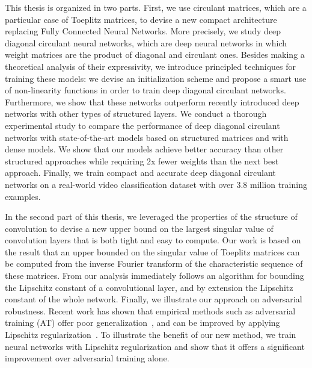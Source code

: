 This thesis is organized in two parts.
First, we use circulant matrices, which are a particular case of Toeplitz matrices, to devise a new compact architecture replacing Fully Connected Neural Networks.
More precisely, we study deep diagonal circulant neural networks, which are deep neural networks in which weight matrices are the product of diagonal and circulant ones.
Besides making a theoretical analysis of their expressivity, we introduce principled techniques for training these models: we devise an initialization scheme and propose a smart use of non-linearity functions in order to train deep diagonal circulant networks. 
Furthermore, we show that these networks outperform recently introduced deep networks with other types of structured layers.
We conduct a thorough experimental study to compare the performance of deep diagonal circulant networks with state-of-the-art models based on structured matrices and with dense models.
We show that our models achieve better accuracy than other structured approaches while requiring 2x fewer weights than the next best approach.
Finally, we train compact and accurate deep diagonal circulant networks on a real-world video classification dataset with over 3.8 million training examples. 

In the second part of this thesis, we leveraged the properties of the structure of convolution to devise a new upper bound on the largest singular value of convolution layers that is both tight and easy to compute. 
Our work is based on the result \cite{gray2006toeplitz} that an upper bounded on the singular value of Toeplitz matrices can be computed from the inverse Fourier transform of the characteristic sequence of these matrices.
From our analysis immediately follows an algorithm for bounding the Lipschitz constant of a convolutional layer, and by extension the Lipschitz constant of the whole network.
Finally, we illustrate our approach on adversarial robustness. 
Recent work has shown that empirical methods such as adversarial training (AT) offer poor generalization~\cite{schmidt2018adversarially}, and can be improved by applying Lipschitz regularization~\cite{farnia2018generalizable}.
To illustrate the benefit of our new method, we train neural networks with Lipschitz regularization and show that it offers a significant improvement over adversarial training alone.





